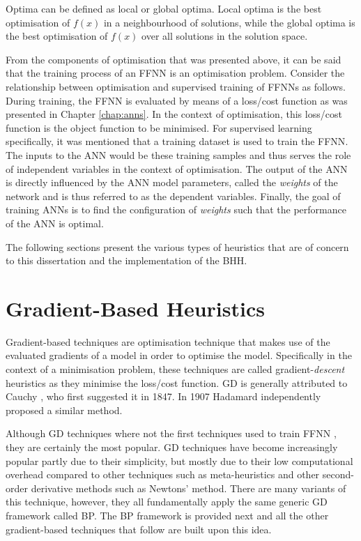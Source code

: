 Optima can be defined as local or global optima. Local optima is the best optimisation of $f(x)$ in a neighbourhood of solutions, while the global optima is the best optimisation of $f(x)$ over all solutions in the solution space.

From the components of optimisation that was presented above, it can be said that the training process of an \ac{FFNN} is an optimisation problem. Consider the relationship between optimisation and supervised training of \acp{FFNN} as follows. During training, the \ac{FFNN} is evaluated by means of a loss/cost function as was presented in Chapter \ref{chap:anns}. In the context of optimisation, this loss/cost function is the object function to be minimised. For supervised learning specifically, it was mentioned that a training dataset is used to train the \ac{FFNN}. The inputs to the \ac{ANN} would be these training samples and thus serves the role of independent variables in the context of optimisation. The output of the \ac{ANN} is directly influenced by the \ac{ANN} model parameters, called the \textit{weights} of the network and is thus referred to as the dependent variables. Finally, the goal of training \acp{ANN} is to find the configuration of \textit{weights} such that the performance of the \ac{ANN} is optimal.

The following sections present the various types of heuristics that are of concern to this dissertation and the implementation of the \ac{BHH}.



\section{Gradient-Based Heuristics}
\label{sec:heuristics:gd}


Gradient-based techniques are optimisation technique that makes use of the evaluated gradients of a model in order to optimise the model. Specifically in the context of a minimisation problem, these techniques are called gradient-\textit{descent} heuristics as they minimise the loss/cost function. \Ac{GD} is generally attributed to Cauchy \cite{ref:lemarechal:2012}, who first suggested it in 1847. In 1907 Hadamard \cite{ref:hadamard:1908} independently proposed a similar method.

Although \ac{GD} techniques where not the first techniques used to train \ac{FFNN}
\cite{ref:engelbrecht:2007}, they are certainly the most popular. \Ac{GD} techniques have become increasingly popular partly due to their simplicity, but mostly due to their low computational overhead compared to other techniques such as meta-heuristics and other second-order derivative methods such as Newtons' method. There are many variants of this technique, however, they all fundamentally apply the same generic \ac{GD} framework called \acl{BP}. The \ac{BP} framework is provided next and all the other gradient-based techniques that follow are built upon this idea.

